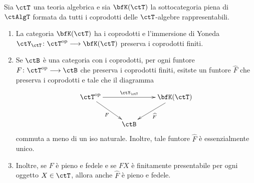 \begin{proposition}\label{prop_compl_cons_copr}
 Sia \(\ctT\) una teoria algebrica e sia \(\bfK(\ctT)\) la sottocategoria piena di \(\ctAlgT\) formata da tutti i coprodotti delle
 \(\ctT\)-algebre rappresentabili.
 \begin{enumerate}
  \item La categoria \(\bfK(\ctT)\) ha i coprodotti e l'immersione di Yoneda \(\ctY_{\ctT} \colon \ctT^{\op} \fun \bfK(\ctT)\) preserva
        i coprodotti finiti.
  \item Se \(\ctB\) è una categoria con i coprodotti, per ogni funtore \(F \colon \ctT^{\op} \fun \ctB\) che preserva i coprodotti
        finiti, esitste un funtore \(\widehat{F}\) che preserva i coprodotti e tale che il diagramma
        \[\xymatrix{\ctT^{\op} \ar[rd]_{F} \ar[rr]^-{\ctY_{\ctT}} & & \bfK(\ctT) \ar[ld]^{\widehat{F}} \\ & \ctB }\]
        commuta a meno di un iso naturale. Inoltre, tale funtore \(\widehat{F}\) è essenzialmente unico.
  \item Inoltre, se \(F\) è pieno e fedele e se \(FX\) è finitamente presentabile per ogni oggetto \(X \in \ctT\), allora anche
        \(\widehat{F}\) è pieno e fedele.
 \end{enumerate}
\end{proposition}

